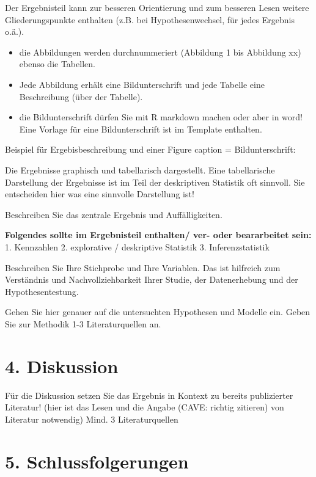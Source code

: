 \documentclass[ngerman,]{article}
\providecommand{\tightlist}{%
  \setlength{\itemsep}{0pt}\setlength{\parskip}{0pt}}
\begin{document}
Der Ergebnisteil kann zur besseren Orientierung und zum besseren Lesen
weitere Gliederungspunkte enthalten (z.B. bei Hypothesenwechsel, für
jedes Ergebnis o.ä.).

\begin{itemize}
\tightlist
\item
  die Abbildungen werden durchnummeriert (Abbildung 1 bis Abbildung xx)
  ebenso die Tabellen.
\item
  Jede Abbildung erhält eine Bildunterschrift und jede Tabelle eine
  Beschreibung (über der Tabelle).
\item
  die Bildunterschrift dürfen Sie mit R markdown machen oder aber in
  word! Eine Vorlage für eine Bildunterschrift ist im Template
  enthalten.
\end{itemize}

Beispiel für Ergebisbeschreibung und einer Figure caption =
Bildunterschrift:

Die Ergebnisse graphisch und tabellarisch dargestellt. Eine
tabellarische Darstellung der Ergebnisse ist im Teil der deskriptiven
Statistik oft sinnvoll. Sie entscheiden hier was eine sinnvolle
Darstellung ist!

 Beschreiben Sie das zentrale Ergebnis und Auffälligkeiten.

\textbf{Folgendes sollte im Ergebnisteil enthalten/ ver- oder
beararbeitet sein: } 1. Kennzahlen 2. explorative / deskriptive
Statistik 3. Inferenzstatistik

Beschreiben Sie Ihre Stichprobe und Ihre Variablen. Das ist hilfreich
zum Verständnis und Nachvollziehbarkeit Ihrer Studie, der Datenerhebung
und der Hypothesentestung.

Gehen Sie hier genauer auf die untersuchten Hypothesen und Modelle ein.
Geben Sie zur Methodik 1-3 Literaturquellen an.

\section{4. Diskussion}\label{diskussion}

Für die Diskussion setzen Sie das Ergebnis in Kontext zu bereits
publizierter Literatur! (hier ist das Lesen und die Angabe (CAVE:
richtig zitieren) von Literatur notwendig) Mind. 3 Literaturquellen

\section{5. Schlussfolgerungen}\label{schlussfolgerungen}
\end{document}
